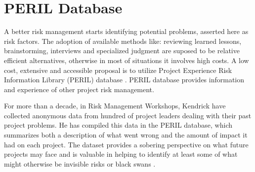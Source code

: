 \section{PERIL Database}
\label{sec:perildataset}

A better risk management starts identifying potential problems, asserted here as risk factors. The adoption of available methods like: reviewing learned lessons, brainstorming, interviews and specialized judgment are suposed to be relative efficient alternatives, otherwise in most of situations it involves high costs. A low cost, extensive and accessible proposal is to utilize Project Experience Risk Information Library (PERIL) database \cite{kendrick2003identifying}. PERIL database provides information and experience of other project risk management.

For more than a decade, in Risk Management Workshops, Kendrick have collected anonymous data from hundred of project leaders dealing with their past project problems. He has compiled this data in the PERIL database, which summarizes both a description of what went wrong and the amount of impact it had on each project. The dataset provides a sobering perspective on what future projects may face and is valuable in helping to identify at least some of what might otherwise be invisible risks or black swans \cite{kendrick2003identifying}.

